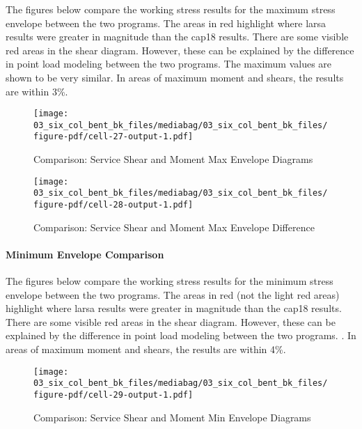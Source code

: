 \documentclass[
  letterpaper,
  DIV=11,
  numbers=noendperiod]{scrartcl}
\let\oldparagraph\paragraph
\renewcommand{\paragraph}[1]{\oldparagraph{#1}\mbox{}}
\begin{document}
The figures below compare the working stress results for the maximum
stress envelope between the two programs. The areas in red highlight
where larsa results were greater in magnitude than the cap18 results.
There are some visible red areas in the shear diagram. However, these
can be explained by the difference in point load modeling between the
two programs. The maximum values are shown to be very similar. In areas
of maximum moment and shears, the results are within 3\%.

\begin{figure}[H]

{\centering \texttt{[image: 03\_six\_col\_bent\_bk\_files/mediabag/03\_six\_col\_bent\_bk\_files/figure-pdf/cell-27-output-1.pdf]}

}

\caption{Comparison: Service Shear and Moment Max Envelope Diagrams}

\end{figure}%

\begin{figure}[H]

{\centering \texttt{[image: 03\_six\_col\_bent\_bk\_files/mediabag/03\_six\_col\_bent\_bk\_files/figure-pdf/cell-28-output-1.pdf]}

}

\caption{Comparison: Service Shear and Moment Max Envelope Difference}

\end{figure}%

\newpage{}

\paragraph{Minimum Envelope
Comparison}\label{minimum-envelope-comparison}

The figures below compare the working stress results for the minimum
stress envelope between the two programs. The areas in red (not the
light red areas) highlight where larsa results were greater in magnitude
than the cap18 results. There are some visible red areas in the shear
diagram. However, these can be explained by the difference in point load
modeling between the two programs. . In areas of maximum moment and
shears, the results are within 4\%.

\begin{figure}[H]

{\centering \texttt{[image: 03\_six\_col\_bent\_bk\_files/mediabag/03\_six\_col\_bent\_bk\_files/figure-pdf/cell-29-output-1.pdf]}

}

\caption{Comparison: Service Shear and Moment Min Envelope Diagrams}

\end{figure}%
\end{document}
